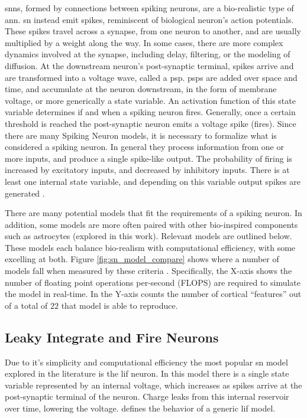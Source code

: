     \glspl{snn}, formed by connections between spiking neurons, are a
    bio-realistic type of \gls{ann}. \gls{sn} instead emit spikes,
    reminiscent of biological neuron's action potentials. These spikes travel
    across a synapse, from one neuron to another, and are usually multiplied by
    a weight along the way. In some cases, there are more complex dynamics
    involved at the synapse, including delay, filtering, or the modeling of
    diffusion. At the downstream neuron's post-synaptic terminal, spikes arrive
    and are transformed into a voltage wave, called a \gls{psp}. \glspl{psp} are
    added over space and time, and accumulate at the neuron downstream, in the
    form of membrane voltage, or more generically a state variable. An
    activation function of this state variable determines if and when a spiking
    neuron fires. Generally, once a certain threshold is reached the
    post-synaptic neuron emits a voltage spike (fires). Since there are many
    Spiking Neuron models, it is necessary to formalize what is considered a
    spiking neuron. In general they process information from one or more inputs,
    and produce a single spike-like output. The probability of firing is
    increased by excitatory inputs, and decreased by inhibitory inputs. There is
    at least one internal state variable, and depending on this variable output
    spikes are generated \parencite{ponulak_2011}.
    
    There are many potential models that fit the requirements of a spiking
    neuron. In addition, some models are more often paired with other
    bio-inspired components such as astrocytes (explored in this work). Relevant
    models are outlined below. These models each balance bio-realism with
    computational efficiency, with some excelling at both. Figure
    \ref{fig:sn_model_compare} shows where a number of models fall when measured
    by these criteria \parencite{izhikevich_2004}. Specifically, the X-axis
    shows the number of floating point operations per-second (FLOPS) are
    required to simulate the model in real-time. In the Y-axis counts the number
    of cortical ``features'' out of a total of $22$ that model is able to
    reproduce.
    

    \subsection{Leaky Integrate and Fire Neurons}
    Due to it's simplicity and computational efficiency the most popular
    \gls{sn} model explored in the literature is the \gls{lif} neuron. In this
    model there is a single state variable represented by an internal voltage,
    which increases as spikes arrive at the post-synaptic terminal of the
    neuron. Charge leaks from this internal reservoir over time, lowering the
    voltage.  defines the behavior of a generic \gls{lif} model.

